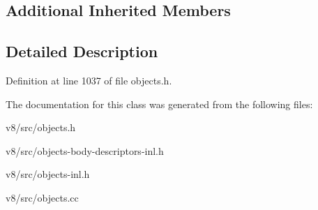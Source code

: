 \subsection*{Additional Inherited Members}


\subsection{Detailed Description}


Definition at line 1037 of file objects.\+h.



The documentation for this class was generated from the following files\+:\begin{DoxyCompactItemize}
\item 
v8/src/objects.\+h\item 
v8/src/objects-\/body-\/descriptors-\/inl.\+h\item 
v8/src/objects-\/inl.\+h\item 
v8/src/objects.\+cc\end{DoxyCompactItemize}
